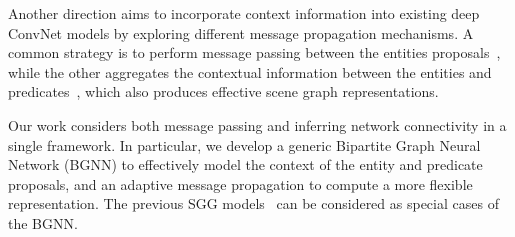 Another direction aims to incorporate context information into existing deep ConvNet models by exploring different message propagation mechanisms. A common strategy is to perform message passing between the entities proposals~\cite{zellers_neural_2017, tang_learning_2018, wang_sketching_2020, woo_linknet:_2018, qi_attentive_2018, wang_exploring_2019, lin_gps-net_2020, chen_knowledge-embedded_2019}, while the other aggregates the contextual information between the entities and predicates~\cite{xu_scene_2017, li_scene_2017, dai_drnet_2017, li_factorizable_2018, yin_zoom-net:_2018, yang_graph_2018, wang_exploring_2019, cong_nodis_nodate}, which also produces effective scene graph representations.


Our work considers both message passing and inferring network connectivity in a single framework. In particular, we develop a generic Bipartite Graph Neural Network (BGNN) to effectively model the context of the entity and predicate proposals, and an adaptive message propagation to compute a more flexible representation. The previous SGG models~\cite{li_scene_2017, xu_scene_2017, li_factorizable_2018, yang_graph_2018} can be considered as special cases of the BGNN.



